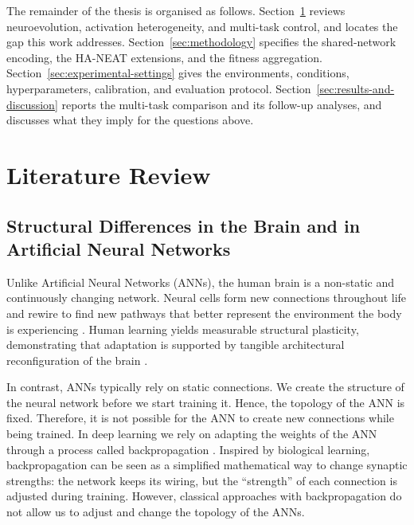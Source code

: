\documentclass[12pt]{article}
\newcommand{\revGram}[2]{#2}
\begin{document}
The remainder of the thesis is organised as follows.
Section~\ref{sec:literature-review} reviews neuroevolution, activation heterogeneity, and multi-task control, and locates the gap this work addresses.
Section~\ref{sec:methodology} specifies the shared-network encoding, the HA-NEAT extensions, and the fitness aggregation.
Section~\ref{sec:experimental-settings} gives the environments, conditions, hyperparameters, calibration, and evaluation protocol.
Section~\ref{sec:results-and-discussion} reports the multi-task comparison and its follow-up analyses, and discusses what they imply for the questions above.

\newpage
\section{Literature Review}
\label{sec:literature-review}


\subsection{Structural Differences in the Brain and in Artificial Neural Networks}
\label{subsec:structural-differences-in-the-brain-and}


Unlike Artificial Neural Networks (ANNs), the human brain is a non-static and continuously changing network.
Neural cells form new connections throughout life and rewire to find new pathways that better represent the environment the body is experiencing \parencite{pascual-leone_plastic_2005,holtmaat_experience-dependent_2009}.
Human learning yields measurable structural plasticity, demonstrating that adaptation is supported by tangible architectural reconfiguration of the brain \parencite{draganski_changes_2004}.

In contrast, ANNs typically rely on static connections.
We create the structure of the neural network before we start training it.
Hence, the topology of the ANN is fixed.
Therefore, it is not possible for the ANN to create new connections while being trained.
\revGram{G-02}{In deep learning we rely on} adapting the weights of the ANN through a process called backpropagation \parencite{rumelhart_learning_1986}.
Inspired by biological learning, backpropagation can be seen as a simplified mathematical way to change synaptic strengths: the network keeps its wiring, but \revGram{G-06}{the ``strength'' of each connection} is adjusted during training.
However, classical approaches with backpropagation do not allow us to adjust and change the topology of the ANNs.
\end{document}
